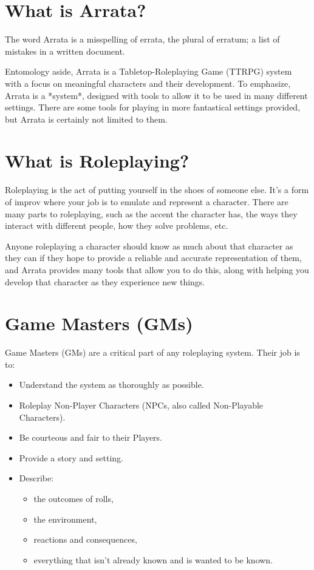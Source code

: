 \documentclass[../main.tex]{subfiles}
\begin{document}
    \section{What is Arrata?}

    The word Arrata is a misspelling of errata, the plural of erratum; a list of mistakes in a written document.
    
    Entomology aside, Arrata is a Tabletop-Roleplaying Game (TTRPG) system with a focus on meaningful characters and their development. To emphasize, Arrata is a *system*, designed with tools to allow it to be used in many different settings. There are some tools for playing in more fantastical settings provided, but Arrata is certainly not limited to them.
    

    \section{What is Roleplaying?}

    Roleplaying is the act of putting yourself in the shoes of someone else. It's a form of improv where your job is to emulate and represent a character. There are many parts to roleplaying, such as the accent the character has, the ways they interact with different people, how they solve problems, etc.
    
    Anyone roleplaying a character should know as much about that character as they can if they hope to provide a reliable and accurate representation of them, and Arrata provides many tools that allow you to do this, along with helping you develop that character as they experience new things.

    \section{Game Masters (GMs)}

    Game Masters (GMs) are a critical part of any roleplaying system. Their job is to:

    \begin{itemize}
        \item Understand the system as thoroughly as possible.
        \item Roleplay Non-Player Characters (NPCs, also called Non-Playable Characters).
        \item Be courteous and fair to their Players.
        \item Provide a story and setting.
        \item Describe:
        \begin{itemize}
            \item the outcomes of rolls,
            \item the environment,
            \item reactions and consequences,
            \item everything that isn't already known and is wanted to be known.
        \end{itemize}
    \end{itemize}
    
\end{document}
